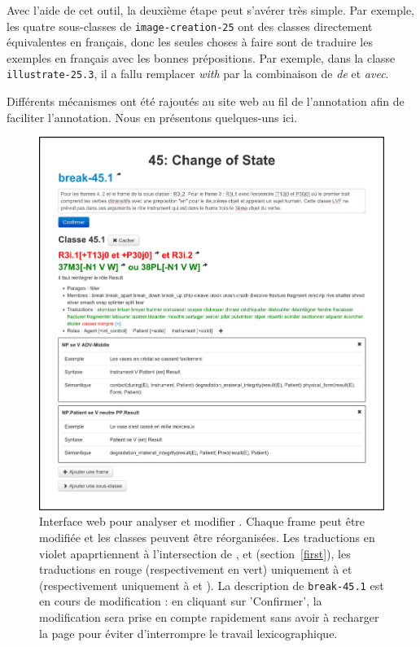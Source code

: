 Avec l'aide de cet outil, la deuxième étape peut s'avérer très simple. Par
exemple, les quatre sous-classes de {\color{blue}\texttt{image-creation-25}}
ont des classes directement équivalentes en français, donc les seules choses à
faire sont de traduire les exemples en français avec les bonnes prépositions.
Par exemple, dans la classe {\color{blue}\texttt{illustrate-25.3}}, il a fallu
remplacer \textit{with} par la combinaison de \textit{de} et \textit{avec}.

Différents mécanismes ont été rajoutés au site web au fil de l'annotation afin
de faciliter l'annotation. Nous en présentons quelques-uns ici.

\begin{figure}[p]

    \includegraphics[width=\textwidth]{fig/tool_screenshot_2014-09-12.png}

    \caption{\label{tool}Interface web pour analyser et modifier \verbenet{}.
        Chaque frame peut être modifiée et les classes peuvent être
        réorganisées. Les traductions en violet apaprtiennent à l'intersection
        de \Clvf{}, \Clg{} et \Ltrad{} (section~\ref{first}), les traductions
        en rouge (respectivement en vert) uniquement à \Clvf{} et \Ltrad
        (respectivement uniquement à \Clg{} et \Ltrad{}). La description de
        {\color{blue}\texttt{break-45.1}} est en cours de modification : en cliquant sur
        'Confirmer', la modification sera prise en compte rapidement sans avoir
    à recharger la page pour éviter d'interrompre le travail lexicographique.}
\end{figure}


